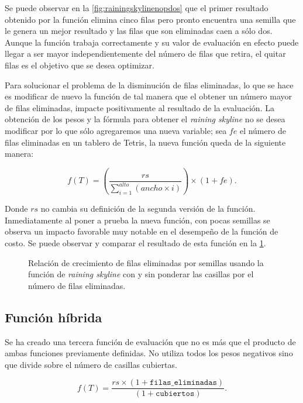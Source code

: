 Se puede observar en la \cref{fig:rainingskylinenopdos} que el primer resultado 
obtenido por la función elimina cinco filas pero pronto encuentra una semilla 
que le genera un mejor resultado y las filas que son eliminadas caen a sólo dos. 
Aunque la función trabaja correctamente y su valor de evaluación en efecto 
puede llegar a ser mayor independientemente del número de filas que retira, 
el quitar filas es el objetivo que se desea optimizar.

Para solucionar el problema de la disminución de filas eliminadas, 
lo que se hace es modificar de nuevo la función de tal manera que el obtener 
un número mayor de filas eliminadas, impacte positivamente al resultado de 
la evaluación. La obtención de los pesos y la fórmula para obtener el \emph{raining 
skyline} no se desea modificar por lo que sólo agregaremos una nueva variable; 
sea $fe$ el número de filas eliminadas en un tablero de Tetris, 
la nueva función queda de la siguiente manera:

 \begin{displaymath}
    f(T) = \left(\frac{rs}{\sum\limits_{i=1}^{alto} (ancho \times i)}\right) \times (1 + fe).
\end{displaymath} 

Donde $rs$ no cambia su definición de la segunda versión de la función. 
Inmediatamente al poner a prueba la nueva función, con pocas semillas se 
observa un impacto favorable muy notable en el desempeño de la función de 
costo. Se puede observar y comparar el resultado de esta función en la 
\cref{fig:rainingskylinenoptres}.

\begin{figure}[h]

\caption[short caption]{Relación de crecimiento de filas eliminadas por semillas usando 
la función de \emph{raining skyline} con y sin ponderar las casillas por el número de filas eliminadas.}
\label{fig:rainingskylinenoptres}
\end{figure} 

\subsection{Función híbrida}

Se ha creado una tercera función de evaluación que no es 
más que el producto de ambas funciones previamente definidas. 
No utiliza todos los pesos negativos sino que divide sobre el número 
de casillas cubiertas. 

\begin{displaymath}
    f(T) = \frac{rs \times (1 + \texttt{filas\_eliminadas})}{(1 + \texttt{cubiertos})}.
\end{displaymath} 

